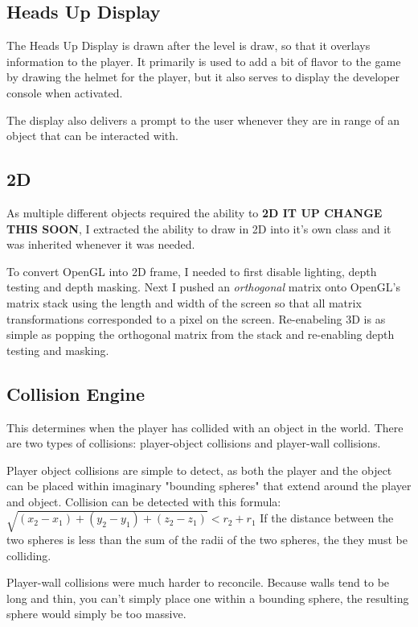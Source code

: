 \documentclass{article}
\begin{document}
\subsection{Heads Up Display}
The Heads Up Display is drawn after the level is draw, so that it overlays information to the player. It primarily is used to add a bit of flavor to the game by drawing the helmet for the player, but it also serves to display the developer console when activated.

The display also delivers a prompt to the user whenever they are in range of an object that can be interacted with.

\subsection{2D}
As multiple different objects required the ability to \textbf{2D IT UP CHANGE THIS SOON}, I extracted the ability to draw in 2D into it's own class and it was inherited whenever it was needed.

To convert OpenGL into 2D frame, I needed to first disable lighting, depth testing and depth masking. Next I pushed an \emph{orthogonal} matrix onto OpenGL's matrix stack using the length and width of the screen so that all matrix transformations corresponded to a pixel on the screen. Re-enabeling 3D is as simple as popping the orthogonal matrix from the stack and re-enabling depth testing and masking.

\subsection{Collision Engine} \label{collision}
This determines when the player has collided with an object in the world. There are two types of collisions: player-object collisions and player-wall collisions.

Player object collisions are simple to detect, as both the player and the object can be placed within imaginary "bounding spheres" that extend around the player and object. Collision can be detected with this formula:
$\sqrt{(x_2 - x_1) + (y_2 - y_1) + (z_2 - z_1)} < r_2 + r_1$
If the distance between the two spheres is less than the sum of the radii of the two spheres, the they must be colliding.

Player-wall collisions were much harder to reconcile. Because walls tend to be long and thin, you can't simply place one within a bounding sphere, the resulting sphere would simply be too massive.
\end{document}
